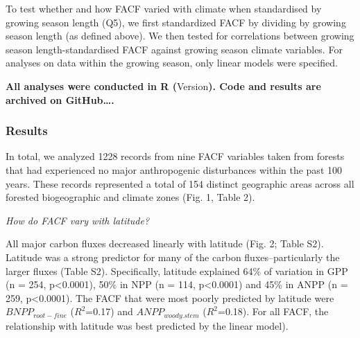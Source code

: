 \documentclass[]{article}
\begin{document}
To test whether and how FACF varied with climate when standardised by
growing season length (Q5), we first standardized FACF by dividing by
growing season length (as defined above). We then tested for
correlations between growing season length-standardised FACF against
growing season climate variables. For analyses on data within the
growing season, only linear models were specified.

\textbf{All analyses were conducted in R (}Version\textbf{). Code and
results are archived on GitHub\ldots{}.}

\subsubsection{Results}\label{results}

In total, we analyzed 1228 records from nine FACF variables taken from
forests that had experienced no major anthropogenic disturbances within
the past 100 years. These records represented a total of 154 distinct
geographic areas across all forested biogeographic and climate zones
(Fig. 1, Table 2).

\emph{How do FACF vary with latitude?}

All major carbon fluxes decreased linearly with latitude (Fig. 2; Table
S2). Latitude was a strong predictor for many of the carbon
fluxes--particularly the larger fluxes (Table S2). Specifically,
latitude explained 64\% of variation in GPP (n = 254,
p\textless{}0.0001), 50\% in NPP (n = 114, p\textless{}0.0001) and 45\%
in ANPP (n = 259, p\textless{}0.0001). The FACF that were most poorly
predicted by latitude were \(BNPP_{root-fine}\) (\(R^2\)=0.17) and
\(ANPP_{woody.stem}\) (\(R^2\)=0.18). For all FACF, the relationship
with latitude was best predicted by the linear model).
\end{document}
